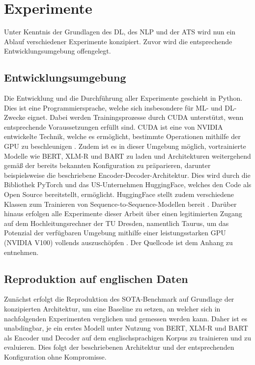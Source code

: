 \chapter{Experimente}
\thispagestyle{fancy}
\label{chap:Experimente}

\noindent
Unter Kenntnis der Grundlagen des \ac{DL}, des \ac{NLP} und der \ac{ATS} wird nun ein Ablauf verschiedener Experimente konzipiert. Zuvor wird die entsprechende Entwicklungsumgebung offengelegt.


\section{Entwicklungsumgebung}
\noindent
Die Entwicklung und die Durchführung aller Experimente geschieht in Python. Dies ist eine Programmiersprache, welche sich insbesondere für \ac{ML}- und \ac{DL}-Zwecke eignet. Dabei werden Trainingsprozesse durch \ac{CUDA} unterstützt, wenn entsprechende Voraussetzungen erfüllt sind. \ac{CUDA} ist eine von NVIDIA entwickelte Technik, welche es ermöglicht, bestimmte Operationen mithilfe der GPU zu beschleunigen \cite{NVI21}. Zudem ist es in dieser Umgebung möglich, vortrainierte Modelle wie \ac{BERT}, {XLM-R} und \ac{BART} zu laden und Architekturen weitergehend gemäß der bereits bekannten Konfiguration zu präparieren, darunter beispielsweise die beschriebene Encoder-Decoder-Architektur. Dies wird durch die Bibliothek PyTorch und das US-Unternehmen HuggingFace, welches den Code als Open Source bereitstellt, ermöglicht. HuggingFace stellt zudem verschiedene Klassen zum Trainieren von Sequence-to-Sequence-Modellen bereit \cite{HUG21}. Darüber hinaus erfolgen alle Experimente dieser Arbeit über einen legitimierten Zugang auf dem Hochleitungsrechner der TU Dresden, namentlich Taurus, um das Potenzial der verfügbaren Umgebung mithilfe einer leistungsstarken GPU (NVIDIA V100) vollends auszuschöpfen \cite{ZIH21}. Der Quellcode ist dem Anhang zu entnehmen.
\newpage


\section{Reproduktion auf englischen Daten}
\noindent
Zunächst erfolgt die Reproduktion des \ac{SOTA}-Benchmark auf Grundlage der konzipierten Architektur, um eine Baseline zu setzen, an welcher sich in nachfolgenden Experimenten verglichen und gemessen werden kann. Daher ist es unabdingbar, je ein erstes Modell unter Nutzung von \ac{BERT}, {XLM-R} und \ac{BART} als Encoder und Decoder auf dem englischsprachigen Korpus zu trainieren und zu evaluieren. Dies folgt der beschriebenen Architektur und der entsprechenden Konfiguration ohne Kompromisse.


